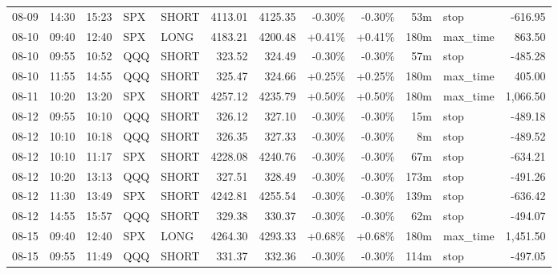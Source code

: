 \documentclass[11pt,a4paper,twoside]{article}
\begin{document}
\begin{center}
\begin{longtable}{>{\color{txtmain}}l l l l l r r r r r >{\color{txtmain}}l r}
08-09 & 14:30 & 15:23 & SPX & SHORT & 4113.01 & 4125.35 & \textcolor{lossred}{-0.30\%} & \textcolor{lossred}{-0.30\%} & 53m & stop & \textcolor{lossred}{-616.95} \\
08-10 & 09:40 & 12:40 & SPX & LONG & 4183.21 & 4200.48 & \textcolor{wingreen}{+0.41\%} & \textcolor{wingreen}{+0.41\%} & 180m & max\_time & \textcolor{wingreen}{863.50} \\
08-10 & 09:55 & 10:52 & QQQ & SHORT & 323.52 & 324.49 & \textcolor{lossred}{-0.30\%} & \textcolor{lossred}{-0.30\%} & 57m & stop & \textcolor{lossred}{-485.28} \\
08-10 & 11:55 & 14:55 & QQQ & SHORT & 325.47 & 324.66 & \textcolor{wingreen}{+0.25\%} & \textcolor{wingreen}{+0.25\%} & 180m & max\_time & \textcolor{wingreen}{405.00} \\
08-11 & 10:20 & 13:20 & SPX & SHORT & 4257.12 & 4235.79 & \textcolor{wingreen}{+0.50\%} & \textcolor{wingreen}{+0.50\%} & 180m & max\_time & \textcolor{wingreen}{1,066.50} \\
08-12 & 09:55 & 10:10 & QQQ & SHORT & 326.12 & 327.10 & \textcolor{lossred}{-0.30\%} & \textcolor{lossred}{-0.30\%} & 15m & stop & \textcolor{lossred}{-489.18} \\
08-12 & 10:10 & 10:18 & QQQ & SHORT & 326.35 & 327.33 & \textcolor{lossred}{-0.30\%} & \textcolor{lossred}{-0.30\%} & 8m & stop & \textcolor{lossred}{-489.52} \\
08-12 & 10:10 & 11:17 & SPX & SHORT & 4228.08 & 4240.76 & \textcolor{lossred}{-0.30\%} & \textcolor{lossred}{-0.30\%} & 67m & stop & \textcolor{lossred}{-634.21} \\
08-12 & 10:20 & 13:13 & QQQ & SHORT & 327.51 & 328.49 & \textcolor{lossred}{-0.30\%} & \textcolor{lossred}{-0.30\%} & 173m & stop & \textcolor{lossred}{-491.26} \\
08-12 & 11:30 & 13:49 & SPX & SHORT & 4242.81 & 4255.54 & \textcolor{lossred}{-0.30\%} & \textcolor{lossred}{-0.30\%} & 139m & stop & \textcolor{lossred}{-636.42} \\
08-12 & 14:55 & 15:57 & QQQ & SHORT & 329.38 & 330.37 & \textcolor{lossred}{-0.30\%} & \textcolor{lossred}{-0.30\%} & 62m & stop & \textcolor{lossred}{-494.07} \\
08-15 & 09:40 & 12:40 & SPX & LONG & 4264.30 & 4293.33 & \textcolor{wingreen}{+0.68\%} & \textcolor{wingreen}{+0.68\%} & 180m & max\_time & \textcolor{wingreen}{1,451.50} \\
08-15 & 09:55 & 11:49 & QQQ & SHORT & 331.37 & 332.36 & \textcolor{lossred}{-0.30\%} & \textcolor{lossred}{-0.30\%} & 114m & stop & \textcolor{lossred}{-497.05} \\

\end{longtable}
\end{center}
\end{document}
